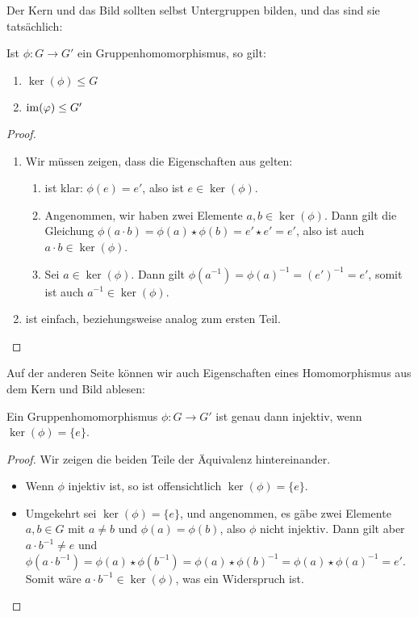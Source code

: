 {Der Kern und das Bild sollten selbst Untergruppen bilden, und das sind sie tatsächlich:

\begin{proposition}
  Ist $\phi \colon G \rightarrow G'$ ein Gruppenhomomorphismus, so gilt:
  \begin{enumerate}[label=\alph*)]
    \item $\ker(\phi) \leq G$
    \item $\operatorname{im}(\varphi) \leq G'$
  \end{enumerate}
\end{proposition}

\begin{proof}
  \begin{enumerate}[label=\alph*)]
    \item Wir müssen zeigen, dass die Eigenschaften aus  gelten:
    \begin{enumerate}
      \item ist klar: $\phi(e)=e'$, also ist $e \in \ker(\phi)$.
      \item Angenommen, wir haben zwei Elemente $a,b \in \ker(\phi)$. Dann gilt die Gleichung $\phi(a \cdot b) = \phi(a) \star \phi(b) = e' \star e' = e'$, also ist auch $a \cdot b \in \ker(\phi)$.
      \item Sei $a \in \ker(\phi)$. Dann gilt $\phi(a^{-1}) = \phi(a)^{-1} = (e')^{-1} = e'$, somit ist auch $a^{-1} \in \ker(\phi)$.
    \end{enumerate}
    \item ist einfach, beziehungsweise analog zum ersten Teil.
  \end{enumerate}
\end{proof}

Auf der anderen Seite können wir auch Eigenschaften eines Homomorphismus aus dem Kern und Bild ablesen:

\begin{proposition}
  Ein Gruppenhomomorphismus $\phi \colon G \rightarrow G'$ ist genau dann injektiv, wenn $\ker(\phi) = \{e\}$.
\end{proposition}

\begin{proof}
  Wir zeigen die beiden Teile der Äquivalenz hintereinander.
  \begin{itemize}
    \item Wenn $\phi$ injektiv ist, so ist offensichtlich $\ker(\phi) = \{e\}$.
    \item Umgekehrt sei $\ker(\phi) = \{e\}$, und angenommen, es gäbe zwei Elemente $a,b \in G$ mit $a \neq b$ und $\phi(a) = \phi(b)$, also $\phi$ nicht injektiv. Dann gilt aber $a \cdot b^{-1} \neq e$ und $\phi(a\cdot b^{-1}) = \phi(a) \star \phi(b^{-1}) = \phi(a) \star \phi(b)^{-1} = \phi(a) \star \phi(a)^{-1} = e'$.
    Somit wäre $a \cdot b^{-1} \in \ker(\phi)$, was ein Widerspruch ist.
  \end{itemize}
\end{proof}

}
